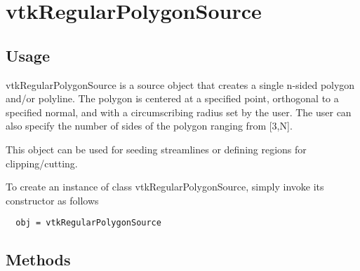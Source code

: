 \section{vtkRegularPolygonSource}

\subsection{Usage}

 vtkRegularPolygonSource is a source object that creates a single n-sided polygon and/or 
 polyline. The polygon is centered at a specified point, orthogonal to
 a specified normal, and with a circumscribing radius set by the user. The user can
 also specify the number of sides of the polygon ranging from [3,N].

 This object can be used for seeding streamlines or defining regions for clipping/cutting.

To create an instance of class vtkRegularPolygonSource, simply
invoke its constructor as follows
\begin{verbatim}
  obj = vtkRegularPolygonSource
\end{verbatim}
\subsection{Methods}

